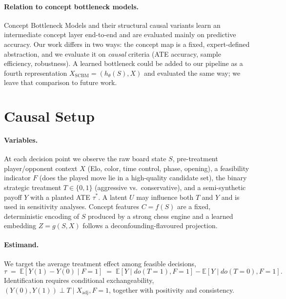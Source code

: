 \documentclass{article}
\begin{document}
\paragraph{Relation to concept bottleneck models.}
Concept Bottleneck Models\cite{koh2020concept} and their structural causal
variants\cite{fromCausalToConcept} learn an intermediate concept layer
end-to-end and are evaluated mainly on predictive accuracy. Our work differs in
two ways: the concept map is a fixed, expert-defined abstraction, and we
evaluate it on \emph{causal} criteria (ATE accuracy, sample efficiency,
robustness). A learned bottleneck could be added to our pipeline as a fourth
representation $X_{\text{SCBM}}=(h_\theta(S),X)$ and evaluated the same way; we
leave that comparison to future work.

\section{Causal Setup}

\paragraph{Variables.}
At each decision point we observe the raw board state $S$, pre-treatment
player/opponent context $X$ (Elo, color, time control, phase, opening), a
feasibility indicator $F$ (does the played move lie in a high-quality candidate
set), the binary strategic treatment $T\in\{0,1\}$ (aggressive vs.\
conservative), and a semi-synthetic payoff $Y$ with a planted ATE $\tau^*$. A
latent $U$ may influence both $T$ and $Y$ and is used in sensitivity analyses.
Concept features $C=f(S)$ are a fixed, deterministic encoding of $S$ produced
by a strong chess engine\cite{stockfish} and a learned embedding $Z=g(S,X)$
follows a deconfounding-flavoured projection.\cite{kuang2020information,deconfoundingScores}

\paragraph{Estimand.}
We target the average treatment effect among feasible decisions,
\[
\tau \;=\; \mathbb{E}[Y(1)-Y(0)\mid F=1]
     \;=\; \mathbb{E}[Y\mid do(T{=}1),F{=}1]-\mathbb{E}[Y\mid do(T{=}0),F{=}1].
\]
Identification requires conditional exchangeability,
$(Y(0),Y(1))\perp T\mid X_{\text{adj}},F=1$, together with positivity and
consistency.\cite{pearl2009causality,hill2011bayesian}
\end{document}
